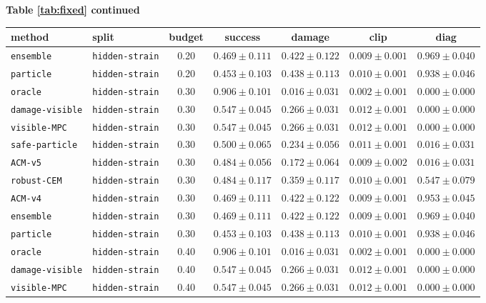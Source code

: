 \documentclass{article}
\begin{document}
\begin{center}
\textbf{Table \ref{tab:fixed} continued}\\[0.4ex]
\begin{tabular}{llccccc}
\toprule
method & split & budget & success & damage & clip & diag \\
\midrule
\texttt{ensemble} & \texttt{hidden-strain} & 0.20 & $0.469 \pm 0.111$ & $0.422 \pm 0.122$ & $0.009 \pm 0.001$ & $0.969 \pm 0.040$ \\
\texttt{particle} & \texttt{hidden-strain} & 0.20 & $0.453 \pm 0.103$ & $0.438 \pm 0.113$ & $0.010 \pm 0.001$ & $0.938 \pm 0.046$ \\
\texttt{oracle} & \texttt{hidden-strain} & 0.30 & $0.906 \pm 0.101$ & $0.016 \pm 0.031$ & $0.002 \pm 0.001$ & $0.000 \pm 0.000$ \\
\texttt{damage-visible} & \texttt{hidden-strain} & 0.30 & $0.547 \pm 0.045$ & $0.266 \pm 0.031$ & $0.012 \pm 0.001$ & $0.000 \pm 0.000$ \\
\texttt{visible-MPC} & \texttt{hidden-strain} & 0.30 & $0.547 \pm 0.045$ & $0.266 \pm 0.031$ & $0.012 \pm 0.001$ & $0.000 \pm 0.000$ \\
\texttt{safe-particle} & \texttt{hidden-strain} & 0.30 & $0.500 \pm 0.065$ & $0.234 \pm 0.056$ & $0.011 \pm 0.001$ & $0.016 \pm 0.031$ \\
\texttt{ACM-v5} & \texttt{hidden-strain} & 0.30 & $0.484 \pm 0.056$ & $0.172 \pm 0.064$ & $0.009 \pm 0.002$ & $0.016 \pm 0.031$ \\
\texttt{robust-CEM} & \texttt{hidden-strain} & 0.30 & $0.484 \pm 0.117$ & $0.359 \pm 0.117$ & $0.010 \pm 0.001$ & $0.547 \pm 0.079$ \\
\texttt{ACM-v4} & \texttt{hidden-strain} & 0.30 & $0.469 \pm 0.111$ & $0.422 \pm 0.122$ & $0.009 \pm 0.001$ & $0.953 \pm 0.045$ \\
\texttt{ensemble} & \texttt{hidden-strain} & 0.30 & $0.469 \pm 0.111$ & $0.422 \pm 0.122$ & $0.009 \pm 0.001$ & $0.969 \pm 0.040$ \\
\texttt{particle} & \texttt{hidden-strain} & 0.30 & $0.453 \pm 0.103$ & $0.438 \pm 0.113$ & $0.010 \pm 0.001$ & $0.938 \pm 0.046$ \\
\texttt{oracle} & \texttt{hidden-strain} & 0.40 & $0.906 \pm 0.101$ & $0.016 \pm 0.031$ & $0.002 \pm 0.001$ & $0.000 \pm 0.000$ \\
\texttt{damage-visible} & \texttt{hidden-strain} & 0.40 & $0.547 \pm 0.045$ & $0.266 \pm 0.031$ & $0.012 \pm 0.001$ & $0.000 \pm 0.000$ \\
\texttt{visible-MPC} & \texttt{hidden-strain} & 0.40 & $0.547 \pm 0.045$ & $0.266 \pm 0.031$ & $0.012 \pm 0.001$ & $0.000 \pm 0.000$ \\

\end{tabular}
\end{center}
\end{document}
